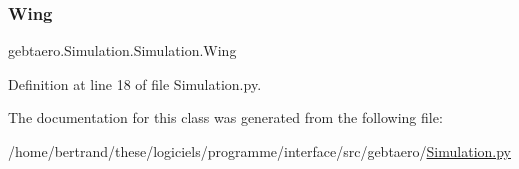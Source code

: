 \mbox{\label{classgebtaero_1_1_simulation_1_1_simulation_a2900b07110293466d8ca5c75ef8e04f8}} 
\subsubsection{\texorpdfstring{Wing}{Wing}}
{\footnotesize\ttfamily gebtaero.\+Simulation.\+Simulation.\+Wing}



Definition at line 18 of file Simulation.\+py.



The documentation for this class was generated from the following file\+:\begin{DoxyCompactItemize}
\item 
/home/bertrand/these/logiciels/programme/interface/src/gebtaero/\hyperlink{_simulation_8py}{Simulation.\+py}\end{DoxyCompactItemize}
